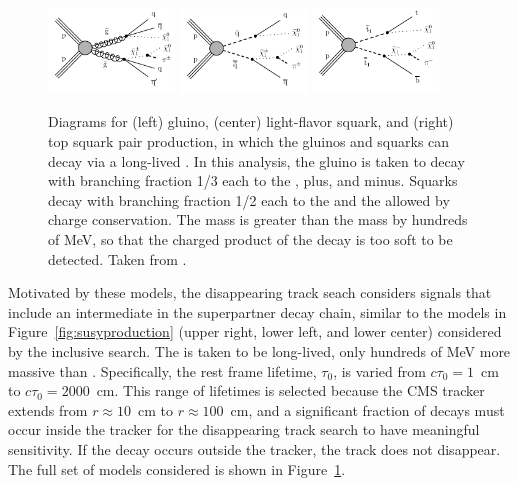   \begin{figure}[htbp]
    \centering
    \includegraphics[width=0.3\textwidth]{figures/MT2_2019/Figure_010-a}
    \includegraphics[width=0.3\textwidth]{figures/MT2_2019/Figure_010-b}
    \includegraphics[width=0.3\textwidth]{figures/MT2_2019/Figure_010-c}
    \caption[Diagrams for (left) gluino, (center) light-flavor squark, and (right) top squark pair production, in which the gluinos and squarks can decay via a long-lived \chargino]{Diagrams for (left) gluino, (center) light-flavor squark, and (right) top squark pair production, in which the gluinos and squarks can decay via a long-lived \chargino. In this analysis, the gluino is taken to decay with branching fraction 1/3 each to the \lsp, \chargino plus, and \chargino minus. Squarks decay with branching fraction 1/2 each to the \lsp and the \chargino allowed by charge conservation. The \chargino mass is greater than the \lsp mass by hundreds of MeV, so that the charged product of the \chargino decay is too soft to be detected. Taken from \cite{MT2_2019}.}
    \label{fig:charginodiags}
  \end{figure}
  
  Motivated by these models, the disappearing track seach considers signals that include an intermediate \chargino in the superpartner decay chain, similar to the models in Figure~\ref{fig:susyproduction} (upper right, lower left, and lower center) considered by the inclusive search.
  The \chargino is taken to be long-lived, only hundreds of MeV more massive than \lsp.
  Specifically, the rest frame \chargino lifetime, $\tau_0$, is varied from $c\tau_0 = 1$~cm to $c\tau_0 = 2000$~cm.
  This range of lifetimes is selected because the CMS tracker extends from $r\approx10$~cm to $r\approx 100$~cm, and a significant fraction of \chargino decays must occur inside the tracker for the disappearing track search to have meaningful sensitivity.
  If the decay occurs outside the tracker, the track does not disappear.
  The full set of models considered is shown in Figure~\ref{fig:charginodiags}.
  
